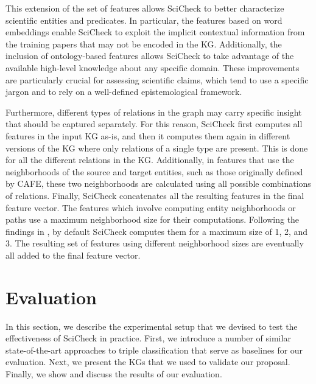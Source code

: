 This extension of the set of features allows SciCheck to better characterize scientific entities and predicates. In particular, the features based on word embeddings enable SciCheck to exploit the implicit contextual information from the training papers that may not be encoded in the KG.
Additionally, the inclusion of ontology-based features allows SciCheck to take advantage of the available high-level knowledge about any specific domain. These improvements are particularly crucial for assessing scientific claims, which tend to use a specific jargon and to rely on a well-defined epistemological framework.

Furthermore, different types of relations in the graph may carry specific insight that should be captured separately. For this reason, SciCheck first computes all features in the input KG as-is, and then it computes them again in different versions of the KG where only relations of a single type are present. This is done for all the different relations in the KG. Additionally, in features that use the neighborhoods of the source and target entities, such as those originally defined by CAFE, these two neighborhoods are calculated using all possible combinations of relations. Finally, SciCheck concatenates all the resulting features in the final feature vector. The features which involve computing entity neighborhoods or paths use a maximum neighborhood size for their computations. Following the findings in \cite{borrego2021}, by default SciCheck computes them for a maximum size of 1, 2, and 3. The resulting set of features using different neighborhood sizes are eventually all added to the final feature vector. %


\section{Evaluation}\label{sec:sci-evaluation}
In this section, we describe the experimental setup that we devised to test the effectiveness of SciCheck in practice. First, we introduce a number of similar state-of-the-art approaches to triple classification that serve as baselines for our evaluation. Next, we present the KGs that we used to validate our proposal. Finally, we show and discuss the results of our evaluation.

